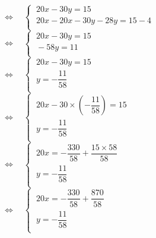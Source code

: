 \documentclass[a4paper,11pt,exos]{nsi} %
\begin{document}
\begin{enumerate}
\begin{tabbing}
            \>  $\iff\quad \left\{
                \begin{array}{l}
                \ 20x-30y=15 \\
                \ 20x-20x-30y-28y=15-4\\
            \end{array} \right.$\\[.5em]

            \>  $\iff\quad \left\{
                \begin{array}{l}
                \ 20x-30y=15 \\
                \ -58y=11\\
            \end{array} \right.$\\[.5em]

            \>  $\iff\quad \left\{
                \begin{array}{l}
                \ 20x-30y=15 \\
                \ y=-\dfrac{11}{58}\\
            \end{array} \right.$\\[.5em]

            \>  $\iff\quad \left\{
                \begin{array}{l}
                \ 20x-30\times\left(-\dfrac{11}{58}\right)=15 \\
                \ y=-\dfrac{11}{58}\\
            \end{array} \right.$\\[.5em]

            \>  $\iff\quad \left\{
                \begin{array}{l}
                \ 20x=-\dfrac{330}{58}+\dfrac{15\times 58}{58} \\[.5em]
                \ y=-\dfrac{11}{58}\\
            \end{array} \right.$\\[.5em]

            \>  $\iff\quad \left\{
                \begin{array}{l}
                \ 20x=-\dfrac{330}{58}+\dfrac{870}{58} \\[.5em]
                \ y=-\dfrac{11}{58}\\
            \end{array} \right.$\\[.5em]


\end{tabbing}
\end{enumerate}
\end{document}
